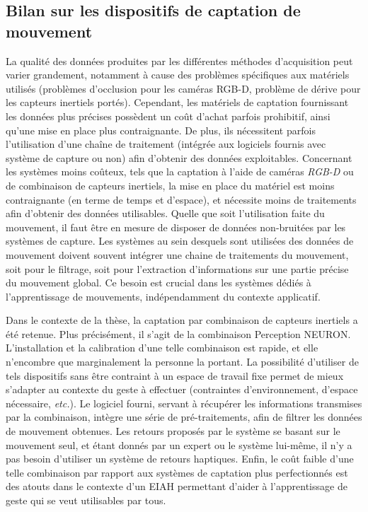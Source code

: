 \subsection{Bilan sur les dispositifs de captation de mouvement}
La qualité des données produites par les différentes méthodes d'acquisition peut varier grandement, notamment à cause des problèmes spécifiques aux matériels utilisés (problèmes d'occlusion pour les caméras RGB-D, problème de dérive pour les capteurs inertiels portés). Cependant, les matériels de captation fournissant les données plus précises possèdent un coût d'achat parfois prohibitif, ainsi qu'une mise en place plus contraignante. De plus, ils nécessitent parfois l'utilisation d'une chaîne de traitement (intégrée aux logiciels fournis avec système de capture ou non) afin d'obtenir des données exploitables. Concernant les systèmes moins coûteux, tels que la captation à l'aide de caméras \textit{RGB-D} ou de combinaison de capteurs inertiels, la mise en place du matériel est moins contraignante (en terme de temps et d'espace), et nécessite moins de traitements afin d'obtenir des données utilisables. Quelle que soit l'utilisation faite du mouvement, il faut être en mesure de disposer de données non-bruitées par les systèmes de capture. Les systèmes au sein desquels sont utilisées des données de mouvement doivent souvent intégrer une chaine de traitements du mouvement, soit pour le filtrage, soit pour l'extraction d'informations sur une partie précise du mouvement global. Ce besoin est crucial dans les systèmes dédiés à l'apprentissage de mouvements, indépendamment du contexte applicatif.

Dans le contexte de la thèse, la captation par combinaison de capteurs inertiels a été retenue. Plus précisément, il s'agit de la combinaison Perception NEURON. L'installation et la calibration d'une telle combinaison est rapide, et elle n'encombre que marginalement la personne la portant. La possibilité d'utiliser de tels dispositifs sans être contraint à un espace de travail fixe permet de mieux s'adapter au contexte du geste à effectuer (contraintes d'environnement, d'espace nécessaire, \textit{etc.}). Le logiciel fourni, servant à récupérer les informations transmises par la combinaison, intègre une série de pré-traitements, afin de filtrer les données de mouvement obtenues. Les retours proposés par le système se basant sur le mouvement seul, et étant donnés par un expert ou le système lui-même, il n'y a pas besoin d'utiliser un système de retours haptiques. Enfin, le coût faible d'une telle combinaison par rapport aux systèmes de captation plus perfectionnés est des atouts dans le contexte d'un EIAH permettant d'aider à l'apprentissage de geste qui se veut utilisables par tous.

